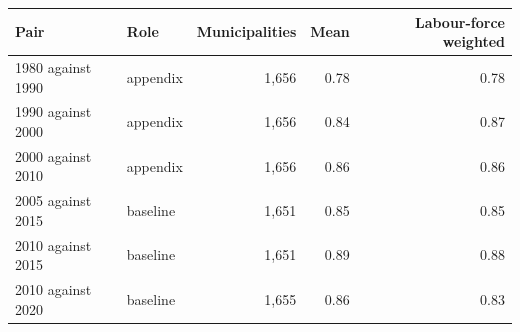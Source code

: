 \begin{tabular}{llrrr}
\toprule
Pair & Role & Municipalities & Mean & Labour-force weighted \\
\midrule
1980 against 1990 & appendix & 1,656 & 0.78 & 0.78 \\
1990 against 2000 & appendix & 1,656 & 0.84 & 0.87 \\
2000 against 2010 & appendix & 1,656 & 0.86 & 0.86 \\
2005 against 2015 & baseline & 1,651 & 0.85 & 0.85 \\
2010 against 2015 & baseline & 1,651 & 0.89 & 0.88 \\
2010 against 2020 & baseline & 1,655 & 0.86 & 0.83 \\
\bottomrule
\end{tabular}
